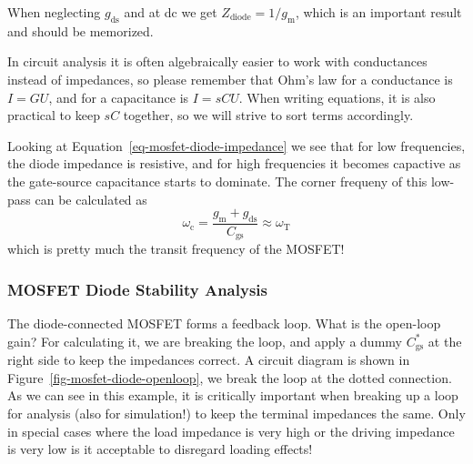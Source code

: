 \documentclass[
  a4paper,
  DIV=11,
  numbers=noendperiod]{scrartcl}
\begin{document}
When neglecting \(g_\mathrm{ds}\) and at dc we get
\(Z_\mathrm{diode} = 1 / g_\mathrm{m}\), which is an important result
and should be memorized.

\begin{tcolorbox}[enhanced jigsaw, arc=.35mm, leftrule=.75mm, toprule=.15mm, bottomrule=.15mm, opacityback=0, toptitle=1mm, colbacktitle=quarto-callout-important-color!10!white, colframe=quarto-callout-important-color-frame, left=2mm, titlerule=0mm, bottomtitle=1mm, coltitle=black, title=\textcolor{quarto-callout-important-color}{\faExclamation}\hspace{0.5em}{Important}, breakable, rightrule=.15mm, colback=white, opacitybacktitle=0.6]

In circuit analysis it is often algebraically easier to work with
conductances instead of impedances, so please remember that Ohm's law
for a conductance is \(I = G U\), and for a capacitance is
\(I = s C U\). When writing equations, it is also practical to keep
\(s C\) together, so we will strive to sort terms accordingly.

\end{tcolorbox}

Looking at Equation~\ref{eq-mosfet-diode-impedance} we see that for low
frequencies, the diode impedance is resistive, and for high frequencies
it becomes capactive as the gate-source capacitance starts to dominate.
The corner frequeny of this low-pass can be calculated as \[
\omega_\mathrm{c} = \frac{g_\mathrm{m}+ g_\mathrm{ds}}{C_\mathrm{gs}} \approx \omega_\mathrm{T}
\] which is pretty much the transit frequency of the MOSFET!

\subsubsection{MOSFET Diode Stability
Analysis}\label{mosfet-diode-stability-analysis}

The diode-connected MOSFET forms a feedback loop. What is the open-loop
gain? For calculating it, we are breaking the loop, and apply a dummy
\(C_\mathrm{gs}^{*}\) at the right side to keep the impedances correct.
A circuit diagram is shown in Figure~\ref{fig-mosfet-diode-openloop}, we
break the loop at the dotted connection. As we can see in this example,
it is critically important when breaking up a loop for analysis (also
for simulation!) to keep the terminal impedances the same. Only in
special cases where the load impedance is very high or the driving
impedance is very low is it acceptable to disregard loading effects!
\end{document}
